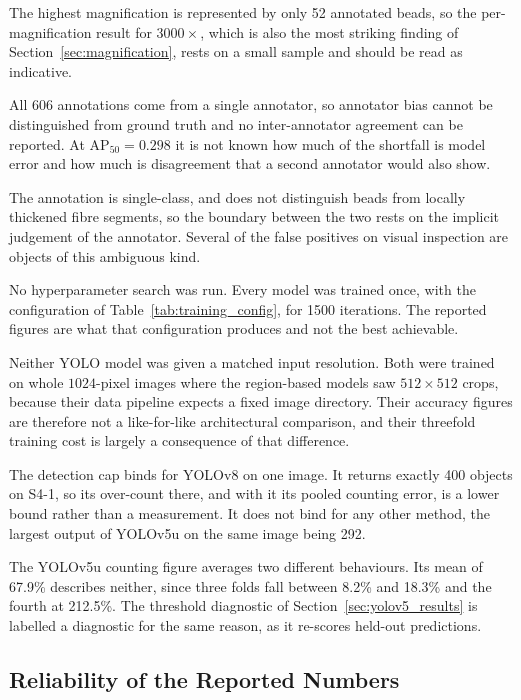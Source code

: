 The highest magnification is represented by only 52 annotated beads, so the per-magnification result for $3000\times$,
which is also the most striking finding of Section~\ref{sec:magnification}, rests
on a small sample and should be read as indicative.

All 606 annotations come from a single annotator, so
annotator bias cannot be distinguished from ground truth and no inter-annotator
agreement can be reported. At $\mathrm{AP}_{50} = 0.298$ it is not known how much
of the shortfall is model error and how much is disagreement that a second
annotator would also show.

The annotation is single-class, and does not distinguish beads from locally
thickened fibre segments, so the boundary between the two rests on the implicit
judgement of the annotator. Several of the false positives on visual inspection
are objects of this ambiguous kind.

No hyperparameter search was run. Every model was trained once, with the
configuration of Table~\ref{tab:training_config}, for 1500 iterations. The
reported figures are what that configuration produces and not the best achievable.

Neither YOLO model was given a matched input resolution. Both were trained on
whole $1024$-pixel images where the region-based models saw
$512 \times 512$ crops, because their data pipeline expects a fixed image
directory. Their accuracy figures are therefore not a like-for-like architectural
comparison, and their threefold training cost is largely a consequence of that
difference.

The detection cap binds for YOLOv8 on one image. It returns exactly
400 objects on S4-1, so its over-count there, and with it its pooled counting error,
is a lower bound rather than a measurement. It does not bind for any other method,
the largest output of YOLOv5u on the same image being 292.

The YOLOv5u counting figure averages two different behaviours. Its mean
of 67.9\% describes neither, since three folds fall between 8.2\% and 18.3\% and
the fourth at 212.5\%. The threshold diagnostic of
Section~\ref{sec:yolov5_results} is labelled a diagnostic for the same reason, as
it re-scores held-out predictions.

\subsection{Reliability of the Reported Numbers}
\label{sec:reliability}

